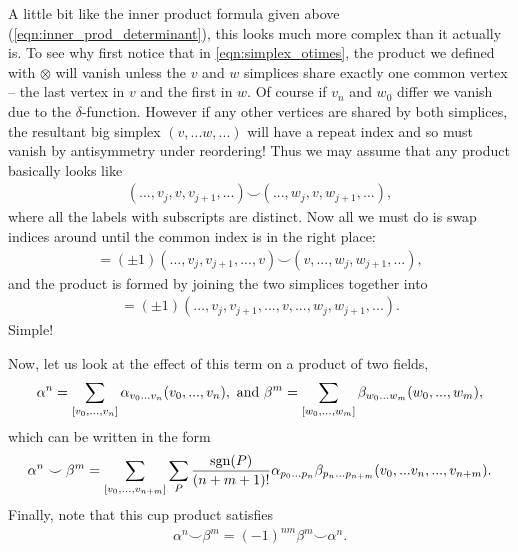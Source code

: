 \documentclass[11pt, oneside]{article} %
\numberwithin{equation}{section}
\begin{document}
\begin{shaded}
    A little bit like the inner product formula given above (\cref{eqn:inner_prod_determinant}), this looks much more complex than it actually is. To see why first notice that in \cref{eqn:simplex_otimes}, the product we defined with $\otimes$ will vanish unless the $v$ and $w$ simplices share exactly one common vertex -- the last vertex in $v$ and the first in $w$. Of course if $v_n$ and $w_0$ differ we vanish due to the $\delta$-function. However if any other vertices are shared by both simplices, the resultant big simplex $(v,...w,...)$ will have a repeat index and so must vanish by antisymmetry under reordering! Thus we may assume that any product basically looks like
    \begin{align}
        (...,v_j, v, v_{j+1} ,...) \smile (...,w_j, v, w_{j+1} ,...),
    \end{align}
    where all the labels with subscripts are distinct. Now all we must do is swap indices around until the common index is in the right place:
    \begin{align}
        = (\pm 1) (...,v_j, v_{j+1} ,...,v ) \smile (v,...,w_j, w_{j+1} ,...),
    \end{align}
    and the product is formed by joining the two simplices together into 
    \begin{align}
    = (\pm 1)(...,v_j, v_{j+1} ,...,v, ...,w_j, w_{j+1} ,...).
    \end{align}    
    Simple!
\end{shaded}

Now, let us look at the effect of this term on a product of two fields, 
\begin{align}
    \alpha^n = \sum_{[v_0, ..., v_n]}\alpha_{v_0 ...v_n}( v_0, ..., v_n), 
    \textup{ and } 
    \beta^m = \sum_{[w_0, ..., w_m]}\beta_{w_0 ...w_m}( w_0, ..., w_m),
\end{align} 
which can be written in the form
\begin{align}\label{eqn:field_cup_product}
    \alpha^n \smile \beta^m = \sum_{[v_0, ...,v_{n+m}]} 
    \sum_{P} \frac{\textup{sgn}(P)}{(n+m+1)!} \alpha_{p_0 ...p_n}\beta_{p_n ...p_{n+m}} (v_0, ...v_n,...,v_{n+m}).
\end{align}
Finally, note that this cup product satisfies
\begin{align}
    \alpha^n \smile \beta^m = (-1)^{nm} \beta^m \smile \alpha^n.
\end{align}

\end{document}
